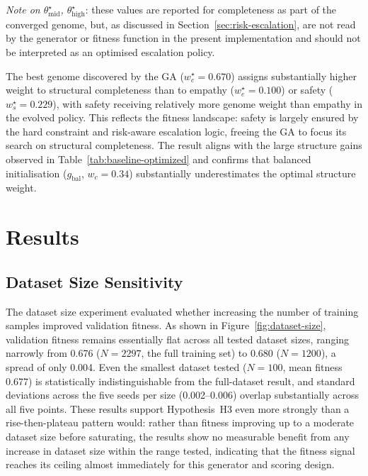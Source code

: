 \documentclass[mathematics,article,xetex,moreauthors]{Definitions/mdpi}
\begin{document}
\emph{Note on $\theta_\mathrm{mid}^{\star}$, $\theta_\mathrm{high}^{\star}$}: these
values are reported for completeness as part of the converged genome, but,
as discussed in Section~\ref{sec:risk-escalation}, are not read by the
generator or fitness function in the present implementation and should not
be interpreted as an optimised escalation policy.

The best genome discovered by the GA ($w_c^{\star} = 0.670$) assigns
substantially higher weight to structural completeness than to empathy
($w_e^{\star} = 0.100$) or safety ($w_s^{\star} = 0.229$), with safety
receiving relatively more genome weight than empathy in the evolved policy.
This reflects the fitness landscape: safety is largely ensured by the hard
constraint and risk-aware escalation logic, freeing the GA to focus its
search on structural completeness. The result aligns with the large structure gains observed in
Table~\ref{tab:baseline-optimized} and confirms that balanced initialisation
($g_\mathrm{bal}$, $w_c = 0.34$) substantially underestimates the optimal
structure weight.

\section{Results}
\label{sec:results}

\subsection{Dataset Size Sensitivity}

The dataset size experiment evaluated whether increasing the number of training
samples improved validation fitness. As shown in Figure~\ref{fig:dataset-size},
validation fitness remains essentially flat across all tested dataset sizes,
ranging narrowly from 0.676 ($N=2297$, the full training set) to 0.680
($N=1200$), a spread of only 0.004. Even the smallest dataset tested
($N=100$, mean fitness 0.677) is statistically indistinguishable from the
full-dataset result, and standard deviations across the five seeds per size
(0.002--0.006) overlap substantially across all five points. These results
support Hypothesis~H3 even more strongly than a rise-then-plateau pattern
would: rather than fitness improving up to a moderate dataset size before
saturating, the results show no measurable benefit from any increase in
dataset size within the range tested, indicating that the fitness signal
reaches its ceiling almost immediately for this generator and scoring
design.
\end{document}
